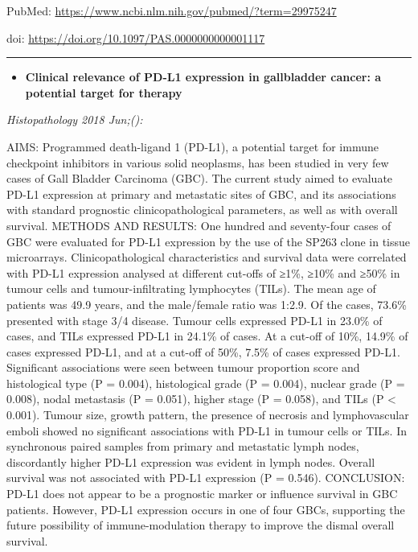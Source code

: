\documentclass[]{article}
\providecommand{\tightlist}{%
  \setlength{\itemsep}{0pt}\setlength{\parskip}{0pt}}
\begin{document}
PubMed: \url{https://www.ncbi.nlm.nih.gov/pubmed/?term=29975247}

doi: \url{https://doi.org/10.1097/PAS.0000000000001117}

{}

{}

\begin{center}\rule{0.5\linewidth}{\linethickness}\end{center}

\begin{itemize}
\tightlist
\item
  \textbf{Clinical relevance of PD-L1 expression in gallbladder cancer:
  a potential target for therapy}
\end{itemize}

\emph{Histopathology 2018 Jun;():}

AIMS: Programmed death-ligand 1 (PD-L1), a potential target for immune
checkpoint inhibitors in various solid neoplasms, has been studied in
very few cases of Gall Bladder Carcinoma (GBC). The current study aimed
to evaluate PD-L1 expression at primary and metastatic sites of GBC, and
its associations with standard prognostic clinicopathological
parameters, as well as with overall survival. METHODS AND RESULTS: One
hundred and seventy-four cases of GBC were evaluated for PD-L1
expression by the use of the SP263 clone in tissue microarrays.
Clinicopathological characteristics and survival data were correlated
with PD-L1 expression analysed at different cut-offs of ≥1\%, ≥10\% and
≥50\% in tumour cells and tumour-infiltrating lymphocytes (TILs). The
mean age of patients was 49.9 years, and the male/female ratio was
1:2.9. Of the cases, 73.6\% presented with stage 3/4 disease. Tumour
cells expressed PD-L1 in 23.0\% of cases, and TILs expressed PD-L1 in
24.1\% of cases. At a cut-off of 10\%, 14.9\% of cases expressed PD-L1,
and at a cut-off of 50\%, 7.5\% of cases expressed PD-L1. Significant
associations were seen between tumour proportion score and histological
type (P = 0.004), histological grade (P = 0.004), nuclear grade (P =
0.008), nodal metastasis (P = 0.051), higher stage (P = 0.058), and TILs
(P \textless{} 0.001). Tumour size, growth pattern, the presence of
necrosis and lymphovascular emboli showed no significant associations
with PD-L1 in tumour cells or TILs. In synchronous paired samples from
primary and metastatic lymph nodes, discordantly higher PD-L1 expression
was evident in lymph nodes. Overall survival was not associated with
PD-L1 expression (P = 0.546). CONCLUSION: PD-L1 does not appear to be a
prognostic marker or influence survival in GBC patients. However, PD-L1
expression occurs in one of four GBCs, supporting the future possibility
of immune-modulation therapy to improve the dismal overall survival.
\end{document}
